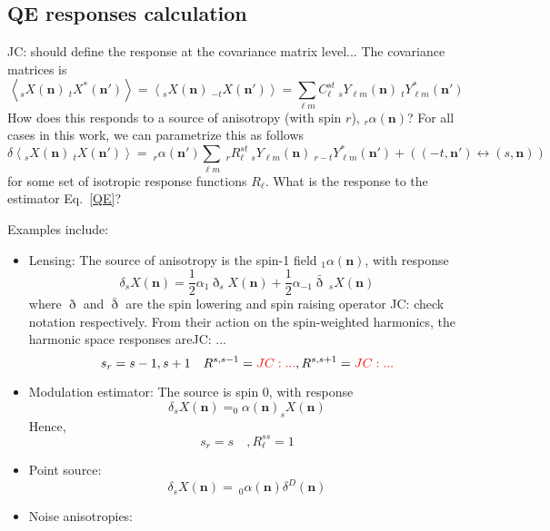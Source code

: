 \documentclass[reprint,prd, superscriptaddress, tightenlines, longbibliography, nofootinbib, eqsecnum, amsfonts, amsmath, floatfix, notitlepage, onecolumn]{revtex4-1}
\newcommand{\Ylm}[1]{\:_{#1}Y_{\ell m}}
\newcommand{\Ylms}[1]{\:_{#1}Y^*_{\ell m}}
\newcommand{\av}[1]{\left\langle #1 \right\rangle}
\newcommand{\JC}[1]{\color{red}JC: #1\color{black}}
\newcommand{\hn}[0]{\boldsymbol{n}}
\begin{document}
 \subsection{QE responses calculation}
 \JC{should define the response at the covariance matrix level...}
 The covariance matrices is
 \begin{equation}
 	\av{_sX(\hn)\:_tX^*(\hn')} =\av{_sX(\hn)\:_{-t}X(\hn')} = \sum_{\ell m} C^{s t}_\ell \Ylm s(\hn) \Ylms {t}(\hn')
 \end{equation}
 How does this responds to a source of anisotropy (with spin $r$), $_r\alpha(\hn)$? For all cases in this work, we can parametrize this as follows
  \begin{equation}
 	\delta \av{_sX(\hn)\:_{t}X(\hn')} = \:_r\alpha(\hn')\sum_{\ell m}\: _rR^{st}_\ell \Ylm s(\hn) \Ylms {r - t}(\hn') + ( (-t, \hn') \leftrightarrow (s,\hn))
 \end{equation}
for some set of isotropic response functions $R_\ell$. What is the response to the estimator Eq.~\eqref{QE}?

Examples include:
\begin{itemize}
	\item Lensing: The source of anisotropy is the spin-1 field $_1\alpha(\hn)$, with response
	\begin{equation}
		\delta _sX(\hn) =  \frac 12 \alpha_1 \eth _{s}X(\hn) + \frac 12 \alpha_{-1} \bar \eth \:_sX(\hn) 
	\end{equation}
	where $\eth$ and $\bar \eth$ are the spin lowering and spin raising operator \JC{check notation } respectively. From their action on the spin-weighted harmonics, the harmonic space responses are\JC{...}
	\begin{equation}
		s_r = s-1, s+ 1 \quad R^{s,s-1} = \JC{...}, R^{s,s+1} = \JC{...}
	\end{equation}
	\item Modulation estimator: The source is spin 0, with response
	\begin{equation}
	\delta _sX(\hn) = _0\alpha(\hn) _{s}X(\hn)	
	\end{equation}
	Hence,
	\begin{equation}
		s_r = s\quad, R_\ell^{ss} = 1
	\end{equation}
	\item Point source:
	\begin{equation}
	\delta _sX(\hn) = \:_0\alpha(\hn) \delta^D(\hn)
	\end{equation}
	\item Noise anisotropies:
\end{itemize} 
\end{document}
